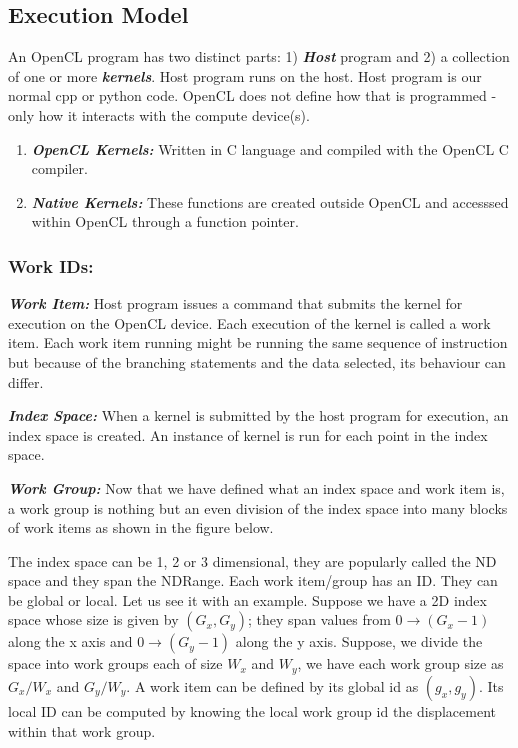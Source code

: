 \documentclass[10pt]{article}
\begin{document}
\subsection{Execution Model}
An OpenCL program has two distinct parts: 1) \textbf{\textit{Host}} program and 2) a collection of one or more \textbf{\textit{kernels}}. Host program runs on the host. Host program is our normal cpp or python code. OpenCL does not define how that is programmed - only how it interacts with the compute device(s).
\begin{enumerate}
	\item \textbf{\textit{OpenCL Kernels:}} Written in C language and compiled with the OpenCL C compiler.
	\item \textbf{\textit{Native Kernels:}} These functions are created outside OpenCL and accesssed within OpenCL through a function pointer.
\end{enumerate}

\subsubsection{Work IDs:}
\textit{\textbf{Work Item:}} Host program issues a command that submits the kernel for execution on the OpenCL device. Each execution of the kernel is called a work item. Each work item running might be running the same sequence of instruction but because of the branching statements and the data selected, its behaviour can differ. 

\textit{\textbf{Index Space:}} When a kernel is submitted by the host program for execution, an index space is created. An instance of kernel is run for each point in the index space.

\textit{\textbf{Work Group:}} Now that we have defined what an index space and work item is, a work group is nothing but an even division of the index space into many blocks of work items as shown in the figure below.


The index space can be 1, 2 or 3 dimensional, they are popularly called the ND space and they span the NDRange. Each work item/group has an ID. They can be global or local. Let us see it with an example. Suppose we have a 2D index space whose size is given by $(G_x, G_y)$; they span values from $0 \rightarrow (G_x-1)$ along the x axis and $0 \rightarrow (G_y-1)$ along the y axis. Suppose, we divide the space into work groups each of size $W_x$ and $W_y$, we have each work group size as $G_x/W_x$ and $G_y/W_y$. A work item can be defined by its global id as $(g_x, g_y)$. Its local ID can be computed by knowing the local work group id the displacement within that work group. 
\end{document}
